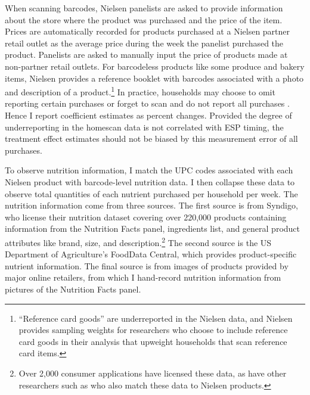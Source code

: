 \documentclass[12pt]{article}
\begin{document}
When scanning barcodes, Nielsen panelists are asked to provide information about the store where the product was purchased and the price of the item. Prices are automatically recorded for products purchased at a Nielsen partner retail outlet as the average price during the week the panelist purchased the product. Panelists are asked to manually input the price of products made at non-partner retail outlets. For barcodeless products like some produce and bakery items, Nielsen provides a reference booklet with barcodes associated with a photo and description of a product.\footnote{``Reference card goods'' are underreported in the Nielsen data, and Nielsen provides sampling weights for researchers who choose to include reference card goods in their analysis that upweight households that scan reference card items.} In practice, households may choose to omit reporting certain purchases or forget to scan and do not report all purchases \parencite{einav2010recording}. Hence I report coefficient estimates as percent changes. Provided the degree of underreporting in the homescan data is not correlated with ESP timing, the treatment effect estimates should not be biased by this measurement error of all purchases.

To observe nutrition information, I match the UPC codes associated with each Nielsen product with barcode-level nutrition data. I then collapse these data to observe total quantities of each nutrient purchased per household per week. The nutrition information come from three sources. The first source is from Syndigo, who license their nutrition dataset covering over 220,000 products containing information from the Nutrition Facts panel, ingredients list, and general product attributes like brand, size, and description.\footnote{Over 2,000 consumer applications have licensed these data, as have other researchers such as \textcite{dubois2014prices} who also match these data to Nielsen products.} The second source is the US Department of Agriculture's FoodData Central, which provides product-specific nutrient information. The final source is from images of products provided by major online retailers, from which I hand-record nutrition information from pictures of the Nutrition Facts panel.
\end{document}
